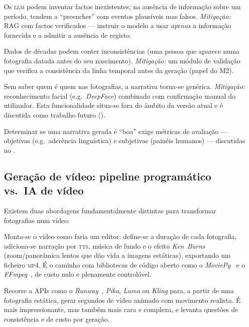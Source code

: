 \begin{description}[leftmargin=*]
  \item[Alucinação.] Os \textsc{llm} podem inventar factos inexistentes;
  na ausência de informação sobre um período, tendem a ``preencher'' com
  eventos plausíveis mas falsos. \emph{Mitigação:} RAG com factos
  verificados — instruir o modelo a usar \emph{apenas} a informação
  fornecida e a admitir a ausência de registo.
  \item[Coerência temporal.] Dados de décadas podem conter
  inconsistências (uma pessoa que aparece numa fotografia datada antes do
  seu nascimento). \emph{Mitigação:} um módulo de validação que verifica
  a consistência da linha temporal antes da geração (papel do M2).
  \item[Identificação de pessoas.] Sem saber quem é quem nas fotografias,
  a narrativa torna-se genérica. \emph{Mitigação:} reconhecimento facial
  (e.g.\ \emph{DeepFace}) combinado com confirmação manual do utilizador.
  Esta funcionalidade situa-se fora do âmbito da versão atual e é
  discutida como trabalho futuro ().
  \item[Avaliação de qualidade.] Determinar se uma narrativa gerada é
  ``boa'' exige métricas de avaliação — objetivas (e.g.\ aderência
  linguística) e subjetivas (painéis humanos) — discutidas no
  .
\end{description}

\subsection{Geração de vídeo: pipeline programático vs.\ IA de vídeo}
\label{sub:geracao_video}

Existem duas abordagens fundamentalmente distintas para transformar
fotografias num vídeo:

\begin{description}[leftmargin=*]
  \item[Abordagem A — \emph{pipeline} programático.] Monta-se o vídeo
  como faria um editor: define-se a duração de cada fotografia,
  adiciona-se narração por \textsc{tts}, música de fundo e o efeito
  \emph{Ken~Burns} (zoom/panorâmica lentos que dão vida a imagens
  estáticas), exportando um ficheiro \textsc{mp4}. É o caminho com
  bibliotecas de código aberto como o \emph{MoviePy}~\cite{moviepy} e o
  \emph{FFmpeg}~\cite{ffmpeg}, de custo nulo e plenamente controlável.
  \item[Abordagem B — geração de vídeo por IA.] Recorre a APIs como o
  \emph{Runway}~\cite{runway}, \emph{Pika}, \emph{Luma} ou \emph{Kling} para, a partir
  de uma fotografia estática, gerar segundos de vídeo animado com
  movimento realista. É mais impressionante, mas também mais cara e
  complexa, e levanta questões de consistência e de custo por geração.
\end{description}

